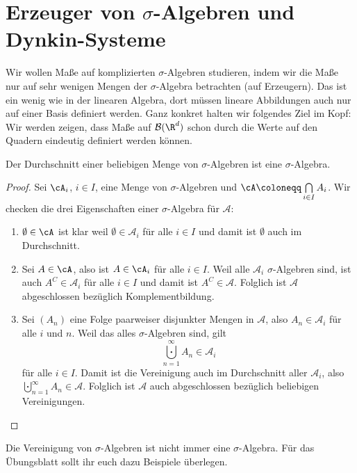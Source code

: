 \section{Erzeuger von $\sigma$-Algebren und Dynkin-Systeme}
Wir wollen Ma\ss e auf komplizierten $\sigma$-Algebren studieren, indem wir die Ma\ss e nur auf sehr wenigen Mengen der $\sigma$-Algebra betrachten (auf Erzeugern). Das ist ein wenig wie in der linearen Algebra, dort m\"ussen lineare Abbildungen auch nur auf einer Basis definiert werden. Ganz konkret halten wir folgendes Ziel im Kopf: Wir werden zeigen, dass Ma\ss e auf $\mathcal B(\R^d)$ schon durch die Werte auf den Quadern eindeutig definiert werden k\"onnen.

\begin{satz}
	Der Durchschnitt einer beliebigen Menge von $\sigma$-Algebren ist eine $\sigma$-Algebra.
\end{satz}
\begin{proof}
	Sei $\cA_i$, $i \in I$, eine Menge von $\sigma$-Algebren und $\cA \coloneqq \bigcap\limits_{i \in I} A_i$. Wir checken die drei Eigenschaften einer $\sigma$-Algebra f\"ur $\mathcal A$:
	\begin{enumerate}[label=(\roman*)]
		\item $\emptyset \in \cA$ ist klar weil $\emptyset\in \mathcal A_i$ f\"ur alle $i\in I$ und damit ist $\emptyset$ auch im Durchschnitt.
		\item Sei $A \in \cA$, also ist  $A \in \cA_i$ f\"ur alle $i\in I$. Weil alle $\mathcal A_i$ $\sigma$-Algebren sind, ist auch $A^C\in \mathcal A_i$ f\"ur alle $i\in I$ und damit ist $A^C\in \mathcal A$. Folglich ist $\mathcal A$ abgeschlossen bez\"uglich Komplementbildung.
				\item Sei $(A_n)$ eine Folge paarweiser disjunkter Mengen in $\mathcal A$, also $A_n \in \mathcal A_i$ f\"ur alle $i$ und $n$. Weil das alles $\sigma$-Algebren sind, gilt \[\bigcupdot\limits_{n = 1}^{\infty} A_n \in \mathcal A_i \]
				f\"ur alle $i\in I$. Damit ist die Vereinigung auch im Durchschnitt aller $\mathcal A_i$, also 
				$\bigcupdot\limits_{n = 1}^{\infty} A_n \in \mathcal A.$
				Folglich ist $\mathcal A$ auch abgeschlossen bez\"uglich beliebigen Vereinigungen.
	\end{enumerate}
\end{proof}

\begin{bem}
	Die Vereinigung von $\sigma$-Algebren ist nicht immer eine $\sigma$-Algebra. F\"ur das \"Ubungsblatt sollt ihr euch dazu Beispiele \"uberlegen.
\end{bem}

